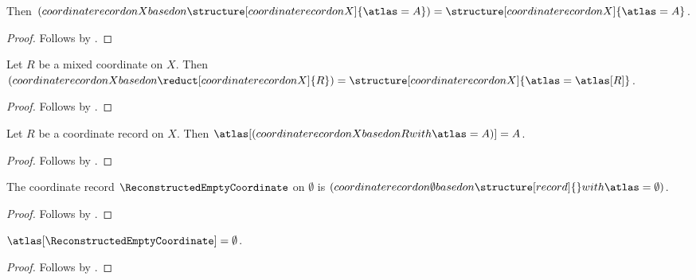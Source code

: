 \begin{proposition}\label{reconstruction_aggregate_base}
    Then $(coordinate record on X based on \structure[coordinate record on X]{\atlas=A})=
        \structure[coordinate record on X]{\atlas=A}$.
\end{proposition}
\begin{proof}
    Follows by .
\end{proof}

\begin{proposition}\label{reconstruction_reduct_base}
    Let $R$ be a mixed coordinate on $X$.
    Then $(coordinate record on X based on \reduct[coordinate record on X]{R})=
        \structure[coordinate record on X]{\atlas=\atlas[R]}$.
\end{proposition}
\begin{proof}
    Follows by .
\end{proof}

\begin{proposition}\label{reconstruction_projection}
    Let $R$ be a coordinate record on $X$.
    Then $\atlas[(coordinate record on X based on R with \atlas=A)]=A$.
\end{proposition}
\begin{proof}
    Follows by .
\end{proof}

\begin{instance}\label{reconstructed_empty_coordinate}
    The coordinate record $\ReconstructedEmptyCoordinate$ on $\emptyset$ is
        $(coordinate record on \emptyset based on \structure[record]{}
            with \atlas=\emptyset)$.
\end{instance}
\begin{proof}
    Follows by .
\end{proof}

\begin{proposition}\label{reconstructed_empty_coordinate_atlas}
    $\atlas[\ReconstructedEmptyCoordinate]=\emptyset$.
\end{proposition}
\begin{proof}
    Follows by .
\end{proof}
